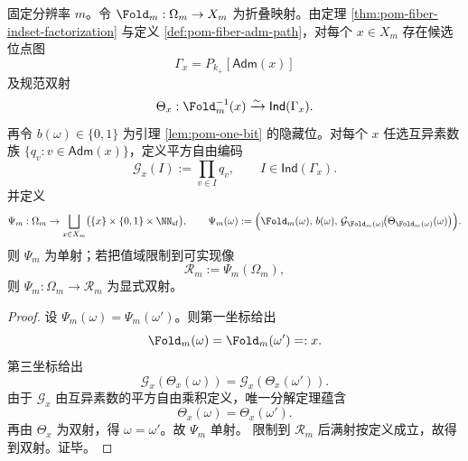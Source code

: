 \begin{theorem}\label{thm:xi-fold-fiber-squarefree-prime-externalization}
固定分辨率 \(m\)。令 \(\Fold_m:\Omega_m\to X_m\) 为折叠映射。由定理 \ref{thm:pom-fiber-indset-factorization} 与定义 \ref{def:pom-fiber-adm-path}，对每个 \(x\in X_m\) 存在候选位点图
\[
\Gamma_x=P_{k_+}[\mathsf{Adm}(x)]
\]
及规范双射
\[
\Theta_x:\Fold_m^{-1}(x)\xrightarrow{\sim}\mathsf{Ind}(\Gamma_x).
\]
再令 \(b(\omega)\in\{0,1\}\) 为引理 \ref{lem:pom-one-bit} 的隐藏位。对每个 \(x\) 任选互异素数族 \(\{q_v:v\in\mathsf{Adm}(x)\}\)，定义平方自由编码
\[
\mathcal G_x(I):=\prod_{v\in I} q_v,\qquad I\in\mathsf{Ind}(\Gamma_x).
\]
并定义
\[
\Psi_m:\Omega_m\to \bigsqcup_{x\in X_m}\bigl(\{x\}\times\{0,1\}\times\NN_{\mathrm{sf}}\bigr),\qquad
\Psi_m(\omega):=\Bigl(\Fold_m(\omega),\,b(\omega),\,\mathcal G_{\Fold_m(\omega)}\!\bigl(\Theta_{\Fold_m(\omega)}(\omega)\bigr)\Bigr).
\]
则 \(\Psi_m\) 为单射；若把值域限制到可实现像
\[
\mathcal R_m:=\Psi_m(\Omega_m),
\]
则 \(\Psi_m:\Omega_m\to\mathcal R_m\) 为显式双射。
\end{theorem}
\begin{proof}
设 \(\Psi_m(\omega)=\Psi_m(\omega')\)。则第一坐标给出
\[
\Fold_m(\omega)=\Fold_m(\omega')=:x.
\]
第三坐标给出
\[
\mathcal G_x(\Theta_x(\omega))=\mathcal G_x(\Theta_x(\omega')).
\]
由于 \(\mathcal G_x\) 由互异素数的平方自由乘积定义，唯一分解定理蕴含
\[
\Theta_x(\omega)=\Theta_x(\omega').
\]
再由 \(\Theta_x\) 为双射，得 \(\omega=\omega'\)。故 \(\Psi_m\) 单射。
限制到 \(\mathcal R_m\) 后满射按定义成立，故得到双射。证毕。
\end{proof}

